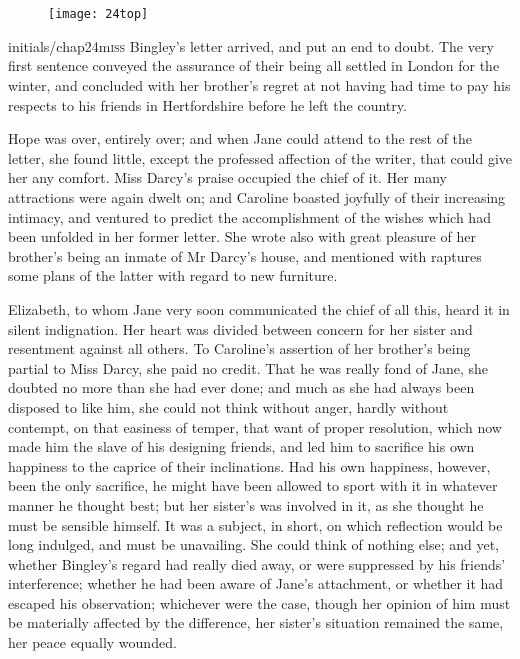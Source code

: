 \chapter[Chapter \thechapter]{}
	
\begin{figure}[t!]
\centering
\texttt{[image: 24top]}
\end{figure}


\lettrine[lines=6,image=true]{initials/chap24m}{iss}  Bingley's letter arrived, and put an end to doubt. The very first sentence conveyed the assurance of their being all settled in London for the winter, and concluded with her brother's regret at not having had time to pay his respects to his friends in Hertfordshire before he left the country.

\zz
Hope was over, entirely over; and when Jane could attend to the rest of the letter, she found little, except the professed affection of the writer, that could give her any comfort. Miss Darcy's praise occupied the chief of it. Her many attractions were again dwelt on; and Caroline boasted joyfully of their increasing intimacy, and ventured to predict the accomplishment of the wishes which had been unfolded in her former letter. She wrote also with great pleasure of her brother's being an inmate of Mr Darcy's house, and mentioned with raptures some plans of the latter with regard to new furniture.

Elizabeth, to whom Jane very soon communicated the chief of all this, heard it in silent indignation. Her heart was divided between concern for her sister and resentment against all others. To Caroline's assertion of her brother's being partial to Miss Darcy, she paid no credit. That he was really fond of Jane, she doubted no more than she had ever done; and much as she had always been disposed to like him, she could not think without anger, hardly without contempt, on that easiness of temper, that want of proper resolution, which now made him the slave of his designing friends, and led him to sacrifice his own happiness to the caprice of their inclinations. Had his own happiness, however, been the only sacrifice, he might have been allowed to sport with it in whatever manner he thought best; but her sister's was involved in it, as she thought he must be sensible himself. It was a subject, in short, on which reflection would be long indulged, and must be unavailing. She could think of nothing else; and yet, whether Bingley's regard had really died away, or were suppressed by his friends' interference; whether he had been aware of Jane's attachment, or whether it had escaped his observation; whichever were the case, though her opinion of him must be materially affected by the difference, her sister's situation remained the same, her peace equally wounded.

